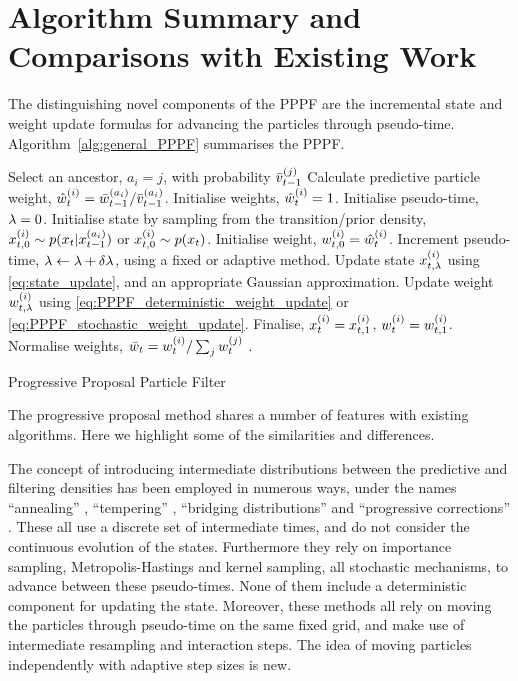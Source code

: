 \documentclass{article}
\begin{document}
\section{Algorithm Summary and Comparisons with Existing Work}

The distinguishing novel components of the PPPF are the incremental state and weight update formulas for advancing the particles through pseudo-time. Algorithm~\ref{alg:general_PPPF} summarises the PPPF.

\begin{algorithm} \label{alg:general_PPPF}
\begin{algorithmic}[1]
        \STATE Select an ancestor, $a_i=j$, with probability $\bar{v}_{t-1}^{(j)}$
        \STATE Calculate predictive particle weight, $\hat{w}_{t}^{(i)} = \bar{w}_{t-1}^{(a_i)} / \bar{v}_{t-1}^{(a_i)}$.
      \ELSE
        \STATE Initialise weights, $\hat{w}_{t}^{(i)} = 1$.
      \ENDIF
      \STATE Initialise pseudo-time, $\lambda=0$.
      \STATE Initialise state by sampling from the transition/prior density, $x_{t,0}^{(i)} \sim p(x_{t} | x_{t-1}^{(a_{i})})$ or $x_{t,0}^{(i)} \sim p(x_{t})$.
      \STATE Initialise weight, $w_{t,0}^{(i)} = \hat{w}_{t}^{(i)}$.
        \STATE Increment pseudo-time, $\lambda \leftarrow \lambda+\delta\lambda$, using a fixed or adaptive method.
        \STATE Update state $x_{t,\lambda}^{(i)}$ using \eqref{eq:state_update}, and an appropriate Gaussian approximation.
        \STATE Update weight $w_{t,\lambda}^{(i)}$ using \eqref{eq:PPPF_deterministic_weight_update} or \eqref{eq:PPPF_stochastic_weight_update}.
      \ENDWHILE
      \STATE Finalise, $x_{t}^{(i)} = x_{t,1}^{(i)}$, $w_{t}^{(i)} = w_{t,1}^{(i)}$.
    \ENDFOR
    \STATE Normalise weights, $\bar{w}_{t} = w_{t}^{(i)} / \sum_j w_{t}^{(j)}$ .
  \ENDFOR
\end{algorithmic}
\caption{Progressive Proposal Particle Filter}
\end{algorithm}

The progressive proposal method shares a number of features with existing algorithms. Here we highlight some of the similarities and differences.

The concept of introducing intermediate distributions between the predictive and filtering densities has been employed in numerous ways, under the names ``annealing'' \citep{Neal2001,Deutscher2000,Gall2007}, ``tempering'' \citep{DelMoral2006}, ``bridging distributions'' \citep{Godsill2001b} and ``progressive corrections'' \citep{Oudjane2000}. These all use a discrete set of intermediate times, and do not consider the continuous evolution of the states. Furthermore they rely on importance sampling, Metropolis-Hastings and kernel sampling, all stochastic mechanisms, to advance between these pseudo-times. None of them include a deterministic component for updating the state. Moreover, these methods all rely on moving the particles through pseudo-time on the same fixed grid, and make use of intermediate resampling and interaction steps. The idea of moving particles independently with adaptive step sizes is new.
\end{document}
